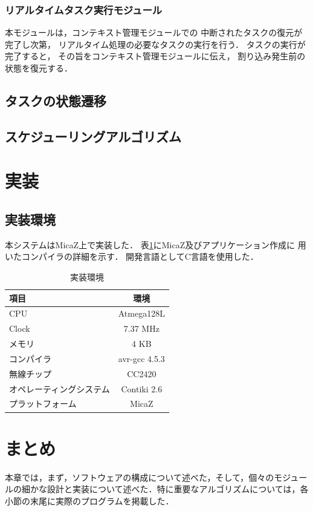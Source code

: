\subsubsection{リアルタイムタスク実行モジュール}

\vspace{0.5em}本モジュールは，コンテキスト管理モジュールでの
中断されたタスクの復元が完了し次第，
リアルタイム処理の必要なタスクの実行を行う．
タスクの実行が完了すると，
その旨をコンテキスト管理モジュールに伝え，
割り込み発生前の状態を復元する．






\subsection{タスクの状態遷移}



\subsection{スケジューリングアルゴリズム}






\section{実装}
\subsection{実装環境}
本システムはMicaZ上で実装した．
表\ref{tab:implementation_env}にMicaZ及びアプリケーション作成に
用いたコンパイラの詳細を示す．
開発言語としてC言語を使用した．


\begin{table}[htb]
  \centering
  \caption{実装環境}
  \begin{tabular}{|l||c|} \hline
  	項目	 & 環境 \\ \hline \hline
	CPU & Atmega128L \\ \hline
	Clock	& 7.37 MHz \\ \hline
	メモリ & 4 KB \\ \hline
	コンパイラ	& avr-gcc 4.5.3 \\ \hline
	無線チップ	& CC2420 \\ \hline
	オペレーティングシステム & Contiki 2.6 \\ \hline
	プラットフォーム & MicaZ \\ \hline
  \end{tabular}
  \label{tab:implementation_env}
\end{table}




\section{まとめ}
本章では，まず，ソフトウェアの構成について述べた，そして，個々のモジュールの細かな設計と実装について述べた．特に重要なアルゴリズムについては，各小節の末尾に実際のプログラムを掲載した．
